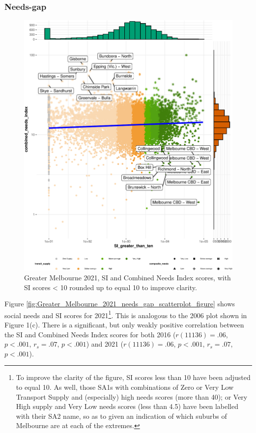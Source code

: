 \documentclass[preprint, 3p,
authoryear]{elsarticle} %
\begin{document}
\subsubsection{Needs-gap}\label{needs-gap}

\begin{figure}
\centering
\includegraphics{ReynoldsCurrieQu2024_files/figure-latex/Greater_Melbourne_2021_needs_gap_scatterplot_figure-1.pdf}
\caption{Greater Melbourne 2021, SI and Combined Needs Index scores,
with SI scores \textless{} 10 rounded up to equal 10 to improve
clarity.}
\end{figure}

Figure \ref{fig:Greater_Melbourne_2021_needs_gap_scatterplot_figure}
shows social needs and SI scores for 2021\footnote{To improve the
  clarity of the figure, SI scores less than 10 have been adjusted to
  equal 10. As well, those SA1s with combinations of Zero or Very Low
  Transport Supply and (especially) high needs scores (more than 40); or
  Very High supply and Very Low needs scores (less than 4.5) have been
  labelled with their SA2 name, so as to given an indication of which
  suburbs of Melbourne are at each of the extremes.}. This is analogous
to the 2006 plot shown in Figure 1(c). There is a significant, but only
weakly positive correlation between the SI and Combined Needs Index
scores for both 2016 (\(r(11136) = .06\), \(p < .001\), \(r_s =.07\),
\(p < .001\)) and 2021 (\(r(11136) = .06\), \(p < .001\), \(r_s =.07\),
\(p < .001\)).
\end{document}
